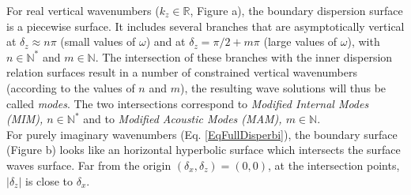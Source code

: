 For real vertical wavenumbers ($k_z\in\mathbb{R}$, Figure a), the boundary dispersion surface is a piecewise surface. It includes several branches that are asymptotically vertical at $\delta_z \approx n\pi$ (small values of $\omega$) and at $\delta_z = \pi/2+m\pi$ (large values of $\omega$), with $n\in\mathbb{N}^\ast$ and $m\in\mathbb{N}$. The intersection of these branches with the inner dispersion relation surfaces result in a number of constrained vertical wavenumbers (according to the values of $n$ and $m$), the resulting wave solutions will thus be called {\it modes}. The two intersections correspond to {\it Modified Internal Modes (MIM),  $n\in\mathbb{N}^\ast$} and to {\it Modified Acoustic Modes (MAM), $m\in\mathbb{N}$}.\\
For purely imaginary wavenumbers (Eq. \ref{EqFullDisperbi}), the boundary surface (Figure b) looks like an horizontal hyperbolic surface which intersects the surface waves surface. Far from the origin $(\delta_x,\delta_z)=(0,0)$, at the intersection points, $|\delta_z|$ is close to $\delta_x$.
